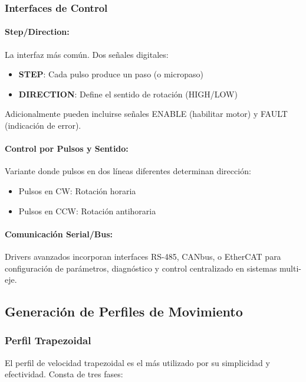 \subsubsection{Interfaces de Control}

\paragraph{Step/Direction:}

La interfaz más común. Dos señales digitales:
\begin{itemize}
    \item \textbf{STEP}: Cada pulso produce un paso (o micropaso)
    \item \textbf{DIRECTION}: Define el sentido de rotación (HIGH/LOW)
\end{itemize}

Adicionalmente pueden incluirse señales ENABLE (habilitar motor) y FAULT (indicación de error).

\paragraph{Control por Pulsos y Sentido:}

Variante donde pulsos en dos líneas diferentes determinan dirección:
\begin{itemize}
    \item Pulsos en CW: Rotación horaria
    \item Pulsos en CCW: Rotación antihoraria
\end{itemize}

\paragraph{Comunicación Serial/Bus:}

Drivers avanzados incorporan interfaces RS-485, CANbus, o EtherCAT para configuración de parámetros, diagnóstico y control centralizado en sistemas multi-eje.

\subsection{Generación de Perfiles de Movimiento}

\subsubsection{Perfil Trapezoidal}

El perfil de velocidad trapezoidal es el más utilizado por su simplicidad y efectividad. Consta de tres fases:

